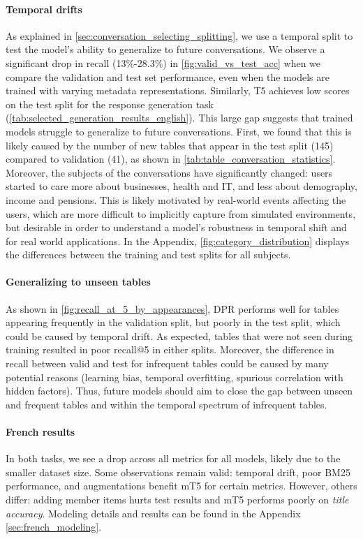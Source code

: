 \documentclass[11pt]{article}
\begin{document}
\paragraph{Temporal drifts}
\label{par:temporal_drift}
As explained in \autoref{sec:conversation_selecting_splitting}, we use a temporal split to test the model's ability to generalize to future conversations. We observe a significant drop in recall (13\%-28.3\%) in \autoref{fig:valid_vs_test_acc} when we compare the validation and test set performance, even when the models are trained with varying metadata representations. Similarly, T5 achieves low scores on the test split for the response generation task (\autoref{tab:selected_generation_results_english}). This large gap suggests that trained models struggle to generalize to future conversations. First, we found that this is likely caused by the number of new tables that appear in the test split (145) compared to validation (41), as shown in \autoref{tab:table_conversation_statistics}. Moreover, the subjects of the conversations have significantly changed: users started to care more about businesses, health and IT, and less about demography, income and pensions. This is likely motivated by real-world events affecting the users, which are more difficult to implicitly capture from simulated environments, but desirable in order to understand a model's robustness in temporal shift and for real world applications. In the Appendix, \autoref{fig:category_distribution} displays the differences between the training and test splits for all subjects.

\paragraph{Generalizing to unseen tables}
\label{par:generalizing_unseen_tables}
As shown in \autoref{fig:recall_at_5_by_appearances}, DPR performs well for tables appearing frequently in the validation split, but poorly in the test split, which could be caused by temporal drift. As expected, tables that were not seen during training resulted in poor recall@5 in either splits. Moreover, the difference in recall between valid and test for infrequent tables could be caused by many potential reasons (learning bias, temporal overfitting, spurious correlation with hidden factors). Thus, future models should aim to close the gap between unseen and frequent tables and within the temporal spectrum of infrequent tables.

\paragraph{French results}
In both tasks, we see a drop across all metrics for all models, likely due to the smaller dataset size.  Some observations remain valid: temporal drift, poor BM25 performance, and augmentations benefit mT5 for certain metrics. However, others differ: adding member items hurts test results and mT5 performs poorly on \textit{title accuracy}. Modeling details and results can be found in the Appendix \ref{sec:french_modeling}. 
\end{document}
